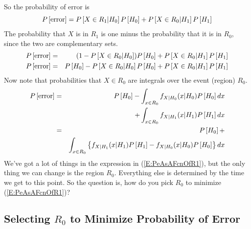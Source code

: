 So the probability of error is
\begin{equation} \label{E:PeBayesianBasic}
   P\left[{\mbox{error}}\right]  = P\left[{X \in R_1 | H_0}\right]P\left[{H_0}\right] +  P\left[{X \in R_0 | H_1 }\right]P\left[{H_1}\right]
\end{equation}
The probability that $X$ is in $R_1$ is one minus the probability
that it is in $R_0$, since the two are complementary sets.
\begin{eqnarray}
   P\left[{\mbox{error}}\right]  &=& (1 - P\left[{X \in R_0 | H_0}\right] )P\left[{H_0}\right] +  P\left[{X \in R_0 | H_1 }\right]P\left[{H_1}\right]
     \nonumber \\
   P\left[{\mbox{error}}\right]  &=& P\left[{H_0}\right] - P\left[{X \in R_0 | H_0}\right] P\left[{H_0}\right] +  P\left[{X \in R_0 | H_1 }\right]P\left[{H_1}\right]
     \nonumber
\end{eqnarray}
Now note that probabilities that $X \in R_0$ are integrals over the
 event (region) $R_0$.
\begin{eqnarray}
   P\left[{\mbox{error}}\right]  &=& P\left[{H_0}\right] - \int_{x \in R_0} f_{X|H_0}(x| H_0) P\left[{H_0}\right]
   dx \nonumber \\ 
     &&                             +  \int_{x \in R_0} f_{X|H_1}(x | H_1) P\left[{H_1}\right] dx
     \nonumber \\
     &=& P\left[{H_0}\right] +     \label{E:PeAsAFcnOfR1} \\
     && \int_{x \in R_0} \left\{f_{X|H_1}(x | H_1) P\left[{H_1}\right] - f_{X|H_0}(x| H_0) P\left[{H_0}\right] \right\}
     dx \nonumber
\end{eqnarray}
We've got a lot of things in the expression in
(\ref{E:PeAsAFcnOfR1}), but the only thing we can change is the
region $R_0$.  Everything else is determined by the time we get to
this point.  So the question is, how do you pick $R_0$ to minimize
(\ref{E:PeAsAFcnOfR1})?

\subsection{Selecting $R_0$ to Minimize Probability of Error}


